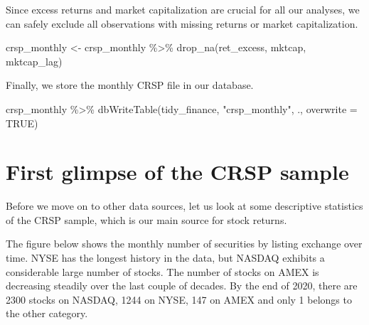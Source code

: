 \documentclass[
]{krantz}
\newenvironment{Shaded}{\begin{snugshade}}{\end{snugshade}}
\newcommand{\AttributeTok}[1]{\textcolor[rgb]{0.61,0.61,0.61}{#1}}
\newcommand{\ConstantTok}[1]{\textcolor[rgb]{0,0,0}{#1}}
\newcommand{\FunctionTok}[1]{\textcolor[rgb]{0,0,0}{#1}}
\newcommand{\NormalTok}[1]{#1}
\newcommand{\OtherTok}[1]{\textcolor[rgb]{0.37,0.37,0.37}{#1}}
\newcommand{\SpecialCharTok}[1]{\textcolor[rgb]{0,0,0}{#1}}
\newcommand{\StringTok}[1]{\textcolor[rgb]{0.5,0.5,0.5}{#1}}
\begin{document}
Since excess returns and market capitalization are crucial for all our analyses, we can safely exclude all observations with missing returns or market capitalization.

\begin{Shaded}
\begin{Highlighting}[]
\NormalTok{crsp\_monthly }\OtherTok{\textless{}{-}}\NormalTok{ crsp\_monthly }\SpecialCharTok{\%\textgreater{}\%}
  \FunctionTok{drop\_na}\NormalTok{(ret\_excess, mktcap, mktcap\_lag)}
\end{Highlighting}
\end{Shaded}

Finally, we store the monthly CRSP file in our database.

\begin{Shaded}
\begin{Highlighting}[]
\NormalTok{crsp\_monthly }\SpecialCharTok{\%\textgreater{}\%}
  \FunctionTok{dbWriteTable}\NormalTok{(tidy\_finance, }\StringTok{"crsp\_monthly"}\NormalTok{, ., }\AttributeTok{overwrite =} \ConstantTok{TRUE}\NormalTok{)}
\end{Highlighting}
\end{Shaded}

\hypertarget{first-glimpse-of-the-crsp-sample}{%
\section{First glimpse of the CRSP sample}\label{first-glimpse-of-the-crsp-sample}}

Before we move on to other data sources, let us look at some descriptive statistics of the CRSP sample, which is our main source for stock returns.

The figure below shows the monthly number of securities by listing exchange over time. NYSE has the longest history in the data, but NASDAQ exhibits a considerable large number of stocks. The number of stocks on AMEX is decreasing steadily over the last couple of decades. By the end of 2020, there are 2300 stocks on NASDAQ, 1244 on NYSE, 147 on AMEX and only 1 belongs to the other category.
\end{document}
